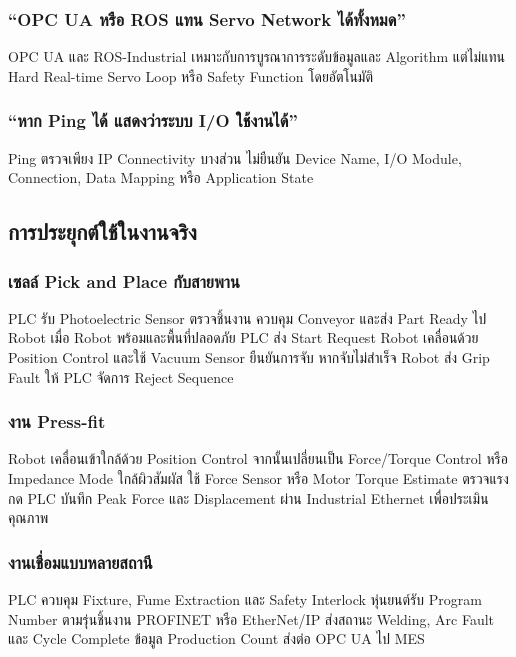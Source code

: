 \subsubsection{“OPC UA หรือ ROS แทน Servo Network ได้ทั้งหมด”}

OPC UA และ ROS-Industrial เหมาะกับการบูรณาการระดับข้อมูลและ Algorithm แต่ไม่แทน Hard Real-time Servo Loop หรือ Safety Function โดยอัตโนมัติ

\subsubsection{“หาก Ping ได้ แสดงว่าระบบ I/O ใช้งานได้”}

Ping ตรวจเพียง IP Connectivity บางส่วน ไม่ยืนยัน Device Name, I/O Module, Connection, Data Mapping หรือ Application State



\subsection{การประยุกต์ใช้ในงานจริง}

\subsubsection{เซลล์ Pick and Place กับสายพาน}

PLC รับ Photoelectric Sensor ตรวจชิ้นงาน ควบคุม Conveyor และส่ง Part Ready ไป Robot เมื่อ Robot พร้อมและพื้นที่ปลอดภัย PLC ส่ง Start Request Robot เคลื่อนด้วย Position Control และใช้ Vacuum Sensor ยืนยันการจับ หากจับไม่สำเร็จ Robot ส่ง Grip Fault ให้ PLC จัดการ Reject Sequence

\subsubsection{งาน Press-fit}

Robot เคลื่อนเข้าใกล้ด้วย Position Control จากนั้นเปลี่ยนเป็น Force/Torque Control หรือ Impedance Mode ใกล้ผิวสัมผัส ใช้ Force Sensor หรือ Motor Torque Estimate ตรวจแรงกด PLC บันทึก Peak Force และ Displacement ผ่าน Industrial Ethernet เพื่อประเมินคุณภาพ

\subsubsection{งานเชื่อมแบบหลายสถานี}

PLC ควบคุม Fixture, Fume Extraction และ Safety Interlock หุ่นยนต์รับ Program Number ตามรุ่นชิ้นงาน PROFINET หรือ EtherNet/IP ส่งสถานะ Welding, Arc Fault และ Cycle Complete ข้อมูล Production Count ส่งต่อ OPC UA ไป MES

